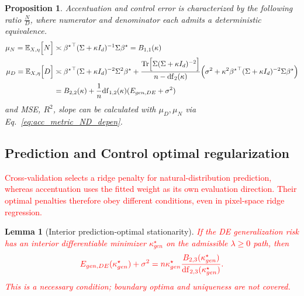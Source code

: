 \documentclass{article}
\newcommand{\red}[1]{\textcolor{red}{#1}}
\providecommand{\propositionname}{Proposition}
\providecommand{\lemmaname}{Lemma}
\theoremstyle{plain}
\newtheorem{prop}[thm]{\propositionname}
\newtheorem{lem}[thm]{\lemmaname}
\theoremstyle{definition}
\theoremstyle{remark}
\begin{document}
\begin{prop}\label{prop:pix_ridge_acc_ND}
Accentuation and control error is characterized by the following ratio
$\frac{N}{D}$, where numerator and denominator each admits a deterministic
equivalence.
\begin{align}\label{eq:pix_ridge_ND_DE_rel}
\mu_{N}=\mathbb{E}_{X,\eta}\Big[N\Big] & \asymp{{\beta^{\star}}}^{\top}(\Sigma+\kappa I_{d})^{-1}\Sigma{\beta^{\star}} =B_{1,1}(\kappa)\\
\mu_{D}=\mathbb{E}_{X,\eta}\Big[D\Big] & \asymp{{\beta^{\star}}}^{\top}(\Sigma+\kappa I_{d})^{-2}\Sigma^{2}{\beta^{\star}}+\frac{\mathrm{Tr}\Big[\Sigma(\Sigma+\kappa I_{d})^{-2}\Big]}{n-\mathrm{df}_{2}(\kappa)}\Big(\sigma^{2}+\kappa^{2}{{\beta^{\star}}}^{\top}(\Sigma+\kappa I_{d})^{-2}\Sigma{\beta^{\star}}\Big)\notag\\
 & =B_{2,2}(\kappa)+\frac{1}{n}\mathrm{df}_{1,2}(\kappa)(E_{gen,DE}+\sigma^{2})
\end{align}
and MSE, $R^2$, slope can be calculated with $\mu_D,\mu_N$ via Eq.~\ref{eq:acc_metric_ND_depen}.
\end{prop}



\subsection{Prediction and Control optimal regularization}

\red{Cross-validation selects a ridge penalty for natural-distribution prediction, whereas accentuation uses the fitted weight as its own evaluation direction. Their optimal penalties therefore obey different conditions, even in pixel-space ridge regression.}

\begin{lem}[Interior prediction-optimal stationarity]\label{lem:pixel-cv-stationarity}
\red{If the DE generalization risk has an interior differentiable minimizer $\kappa_{gen}^{\star}$ on the admissible $\lambda\geq0$ path, then}
\begin{equation}
\color{red}
E_{gen,DE}(\kappa_{gen}^{\star})+\sigma^{2}
=n\kappa_{gen}^{\star}\frac{B_{2,3}(\kappa_{gen}^{\star})}{\mathrm{df}_{2,3}(\kappa_{gen}^{\star})}.
\label{eq:pred_optim_reg_cond2}
\end{equation}
\red{This is a necessary condition; boundary optima and uniqueness are not covered.}
\end{lem}
\end{document}
